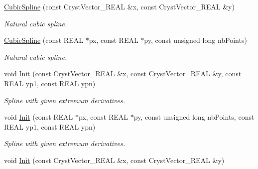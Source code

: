 \begin{DoxyCompactItemize}
\mbox{\label{class_cubic_spline_ad2b267f8e9318a4a0d841ad1b07592f6}} 
\mbox{\hyperlink{class_cubic_spline_ad2b267f8e9318a4a0d841ad1b07592f6}{Cubic\+Spline}} (const Cryst\+Vector\+\_\+\+R\+E\+AL \&x, const Cryst\+Vector\+\_\+\+R\+E\+AL \&y)
\begin{DoxyCompactList}\small\item\em Natural cubic spline. \end{DoxyCompactList}\item 
\mbox{\label{class_cubic_spline_a7f5839dfe86ee680fd2d554d0c04221b}} 
\mbox{\hyperlink{class_cubic_spline_a7f5839dfe86ee680fd2d554d0c04221b}{Cubic\+Spline}} (const R\+E\+AL $\ast$px, const R\+E\+AL $\ast$py, const unsigned long nb\+Points)
\begin{DoxyCompactList}\small\item\em Natural cubic spline. \end{DoxyCompactList}\item 
\mbox{\label{class_cubic_spline_a2a9501b0f12aafa8f7cd3c3c4e842a91}} 
void \mbox{\hyperlink{class_cubic_spline_a2a9501b0f12aafa8f7cd3c3c4e842a91}{Init}} (const Cryst\+Vector\+\_\+\+R\+E\+AL \&x, const Cryst\+Vector\+\_\+\+R\+E\+AL \&y, const R\+E\+AL yp1, const R\+E\+AL ypn)
\begin{DoxyCompactList}\small\item\em Spline with given extremum derivatives. \end{DoxyCompactList}\item 
\mbox{\label{class_cubic_spline_aa1ed1465ea9734c0ed05b04f9ae7c47b}} 
void \mbox{\hyperlink{class_cubic_spline_aa1ed1465ea9734c0ed05b04f9ae7c47b}{Init}} (const R\+E\+AL $\ast$px, const R\+E\+AL $\ast$py, const unsigned long nb\+Points, const R\+E\+AL yp1, const R\+E\+AL ypn)
\begin{DoxyCompactList}\small\item\em Spline with given extremum derivatives. \end{DoxyCompactList}\item 
\mbox{\label{class_cubic_spline_a84962d14bf6ff65bfacb6cd427e07391}} 
void \mbox{\hyperlink{class_cubic_spline_a84962d14bf6ff65bfacb6cd427e07391}{Init}} (const Cryst\+Vector\+\_\+\+R\+E\+AL \&x, const Cryst\+Vector\+\_\+\+R\+E\+AL \&y)

\end{DoxyCompactItemize}

